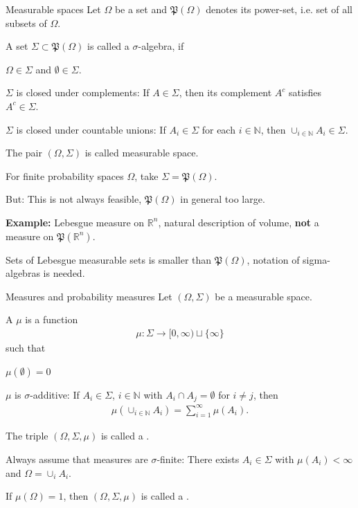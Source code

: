 \begin{frame}{Measurable spaces}
Let $\Omega$ be a set and $\mathfrak{P}(\Omega)$ denotes its power-set, i.e. set of all subsets of $\Omega$. 

\bit
\item A set $\Sigma\subset\mathfrak{P}(\Omega)$ is called a $\sigma$-algebra, if
\bit
\item $\Omega\in\Sigma$ and $\emptyset\in\Sigma$.
\item $\Sigma$ is closed under complements: If $A\in\Sigma$, then its complement $A^c$ satisfies $A^c\in\Sigma$. 
\item $\Sigma$ is closed under countable unions: If $A_i\in\Sigma$ for each $i\in\mathbb{N}$, then $\cup_{i\in\mathbb{N}}A_i\in\Sigma$.  
\eit
\item The pair $(\Omega,\Sigma)$ is called measurable space.
\eit 
{}
\bit 
\item For finite probability spaces $\Omega$, take $\Sigma=\mathfrak{P}(\Omega)$. 
\item But: This is not always feasible, $\mathfrak{P}(\Omega)$ in general too large.  
\item \textbf{Example:} Lebesgue measure on $\mathbb{R}^n$, natural 
description of volume, \textbf{not} a measure on $\mathfrak{P}(\mathbb{R}^n)$. 
\item Sets of Lebesgue measurable sets is smaller than $\mathfrak{P}(\Omega)$, notation of sigma-algebras is needed. 
\eit
\end{frame}

\begin{frame}{Measures and probability measures}
Let $(\Omega,\Sigma)$ be a measurable space. 
\bit
\item A  $\mu$ is a function 
\begin{align*}
\mu:\Sigma\longrightarrow [0,\infty)\sqcup\{\infty\}
\end{align*}
such that
\bit
\item $\mu(\emptyset)=0$
\item $\mu$ is $\sigma$-additive: If $A_i\in\Sigma$, $i\in\mathbb{N}$ with $A_i\cap A_j=\emptyset$ for $i\neq j$, then
\begin{align*}
\mu(\cup_{i\in\mathbb{N}}A_i)=\sum_{i=1}^\infty \mu(A_i). 
\end{align*}
 \eit
\item The triple $(\Omega,\Sigma,\mu)$ is called a . 
\item Always assume that measures are $\sigma$-finite: There exists $A_i\in\Sigma$ with $\mu(A_i)<\infty$ and $\Omega=\cup_iA_i$.  
\item If $\mu(\Omega)=1$, then $(\Omega,\Sigma,\mu)$ is called a .
\eit
\end{frame}

